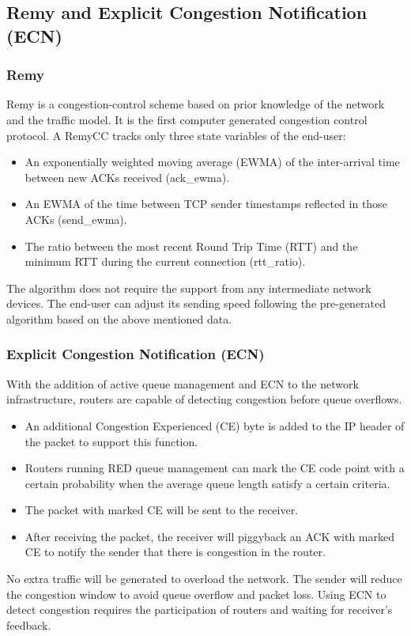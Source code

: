 \documentclass{beamer}
\begin{document}
\subsection{Remy and Explicit Congestion Notification (ECN)}
\begin{frame}
\frametitle{Remy}
Remy is a congestion-control scheme based on prior knowledge of the network and the traffic model. It is the first computer generated congestion control protocol. A RemyCC tracks only three state variables of the end-user:
\begin{itemize}
\item An exponentially weighted moving average (EWMA) of the inter-arrival time between new ACKs received (ack\_ewma).
\item An EWMA of the time between TCP sender timestamps reflected in those ACKs (send\_ewma).
\item The ratio between the most recent Round Trip Time (RTT) and the minimum RTT during the current connection (rtt\_ratio).
\end{itemize}
The algorithm does not require the support from any intermediate network devices. The end-user can adjust its sending speed following the pre-generated algorithm based on the above mentioned data.
\end{frame}

\begin{frame}
\frametitle{Explicit Congestion Notification (ECN)}
With the addition of active queue management and ECN to the network infrastructure, routers are capable of detecting congestion before queue overflows. 
\begin{itemize}
\item An additional Congestion Experienced (CE) byte is added to the IP header of the packet to support this function.
\item Routers running RED queue management can mark the CE code point with a certain probability when the average queue length satisfy a certain criteria.
\item The packet with marked CE will be sent to the receiver.
\item After receiving the packet, the receiver will piggyback an ACK with marked CE to notify the sender that there is congestion in the router.
\end{itemize}   
No extra traffic will be generated to overload the network. The sender will reduce the congestion window to avoid queue overflow and packet loss. Using ECN to detect congestion requires the participation of routers and waiting for receiver's feedback.
\end{frame}
\end{document}

